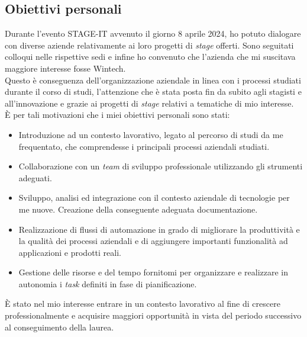 \subsection{Obiettivi personali}
Durante l'evento STAGE-IT avvenuto il giorno 8 aprile 2024, ho potuto dialogare con diverse aziende relativamente ai loro progetti di \emph{stage} offerti. Sono seguitati colloqui nelle rispettive sedi e infine ho convenuto che l'azienda che mi suscitava maggiore interesse fosse Wintech.\\
Questo è conseguenza dell'organizzazione aziendale in linea con i processi studiati durante il corso di studi, l'attenzione che è stata posta fin da subito agli stagisti e all'innovazione e grazie ai progetti di \emph{stage} relativi a tematiche di mio interesse.\\
È per tali motivazioni che i miei obiettivi personali sono stati:
\begin{itemize}
    \item Introduzione ad un contesto lavorativo, legato al percorso di studi da me frequentato, che comprendesse i principali processi aziendali studiati. 
    \item Collaborazione con un \emph{team} di sviluppo professionale utilizzando gli strumenti adeguati. 
    \item Sviluppo, analisi ed integrazione con il contesto aziendale di tecnologie per me nuove. Creazione della conseguente adeguata documentazione. 
    \item Realizzazione di flussi di automazione in grado di migliorare la produttività e la qualità dei processi aziendali e di aggiungere importanti funzionalità ad applicazioni e prodotti reali. 
    \item Gestione delle risorse e del tempo fornitomi per organizzare e realizzare in autonomia i \emph{task} definiti in fase di pianificazione.\\
\end{itemize}
È stato nel mio interesse entrare in un contesto lavorativo al fine di crescere professionalmente e acquisire maggiori opportunità in vista del periodo successivo al conseguimento della laurea. 
 
 
